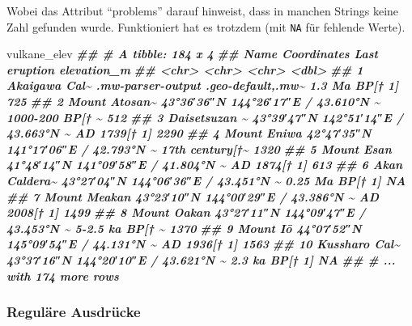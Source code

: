 \documentclass[
  ngerman,
]{article}
\newenvironment{Shaded}{\begin{snugshade}}{\end{snugshade}}
\newcommand{\DocumentationTok}[1]{\textcolor[rgb]{0.56,0.35,0.01}{\textbf{\textit{#1}}}}
\newcommand{\NormalTok}[1]{#1}
\begin{document}
Wobei das Attribut ``problems'' darauf hinweist, dass in manchen Strings keine Zahl gefunden wurde. Funktioniert hat es trotzdem (mit \texttt{NA} für fehlende Werte).

\begin{Shaded}
\begin{Highlighting}[]
\NormalTok{vulkane\_elev}
\DocumentationTok{\#\# \# A tibble: 184 x 4}
\DocumentationTok{\#\#    Name          Coordinates                         \textasciigrave{}Last eruption\textasciigrave{} elevation\_m}
\DocumentationTok{\#\#    \textless{}chr\textgreater{}         \textless{}chr\textgreater{}                               \textless{}chr\textgreater{}                 \textless{}dbl\textgreater{}}
\DocumentationTok{\#\#  1 Akaigawa Cal\textasciitilde{} .mw{-}parser{-}output .geo{-}default,.mw\textasciitilde{} 1.3 Ma BP[† 1]          725}
\DocumentationTok{\#\#  2 Mount Atosan\textasciitilde{} 43°36′36″N 144°26′17″E﻿ / ﻿43.610°N \textasciitilde{} 1000{-}200 BP[† \textasciitilde{}         512}
\DocumentationTok{\#\#  3 Daisetsuzan \textasciitilde{} 43°39′47″N 142°51′14″E﻿ / ﻿43.663°N \textasciitilde{} AD 1739[† 1]           2290}
\DocumentationTok{\#\#  4 Mount Eniwa   42°47′35″N 141°17′06″E﻿ / ﻿42.793°N \textasciitilde{} 17th century[†\textasciitilde{}        1320}
\DocumentationTok{\#\#  5 Mount Esan    41°48′14″N 141°09′58″E﻿ / ﻿41.804°N \textasciitilde{} AD 1874[† 1]            613}
\DocumentationTok{\#\#  6 Akan Caldera\textasciitilde{} 43°27′04″N 144°06′36″E﻿ / ﻿43.451°N \textasciitilde{} 0.25 Ma BP[† 1]          NA}
\DocumentationTok{\#\#  7 Mount Meakan  43°23′10″N 144°00′29″E﻿ / ﻿43.386°N \textasciitilde{} AD 2008[† 1]           1499}
\DocumentationTok{\#\#  8 Mount Oakan   43°27′11″N 144°09′47″E﻿ / ﻿43.453°N \textasciitilde{} 5{-}2.5 ka BP[† \textasciitilde{}        1370}
\DocumentationTok{\#\#  9 Mount Iō      44°07′52″N 145°09′54″E﻿ / ﻿44.131°N \textasciitilde{} AD 1936[† 1]           1563}
\DocumentationTok{\#\# 10 Kussharo Cal\textasciitilde{} 43°37′16″N 144°20′10″E﻿ / ﻿43.621°N \textasciitilde{} 2.3 ka BP[† 1]           NA}
\DocumentationTok{\#\# \# ... with 174 more rows}
\end{Highlighting}
\end{Shaded}

\hypertarget{reguluxe4re-ausdruxfccke}{%
\subsubsection{Reguläre Ausdrücke}\label{reguluxe4re-ausdruxfccke}}
\end{document}
